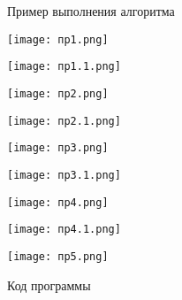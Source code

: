 \documentclass[a4paper,14p]{article}
\begin{document}
\vspace{10pt}
\begin{center}
    \large Пример выполнения алгоритма
\end{center}

\texttt{[image: пр1.png]}

\texttt{[image: пр1.1.png]}

\texttt{[image: пр2.png]}

\texttt{[image: пр2.1.png]}

\texttt{[image: пр3.png]}

\texttt{[image: пр3.1.png]}

\texttt{[image: пр4.png]}

\texttt{[image: пр4.1.png]}

\texttt{[image: пр5.png]}

\vspace{10pt}
\begin{center}
    \large Код программы
\end{center}
\end{document}
